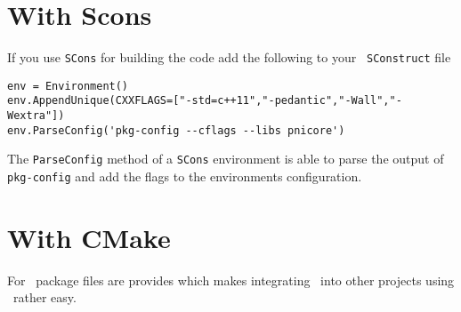 \section{With Scons}

If you use {\tt SCons} for building the code add the following to your {\tt
SConstruct} file
\begin{verbatim}
env = Environment()
env.AppendUnique(CXXFLAGS=["-std=c++11","-pedantic","-Wall","-Wextra"])
env.ParseConfig('pkg-config --cflags --libs pnicore')
\end{verbatim}
The {\tt ParseConfig} method of a {\tt SCons} environment is able to parse the
output of {\tt pkg-config} and add the flags to the environments configuration.

\section{With CMake}

For \cmake\ package files are provides which makes integrating \libpnicore\ into
other projects using \cmake\ rather easy.

